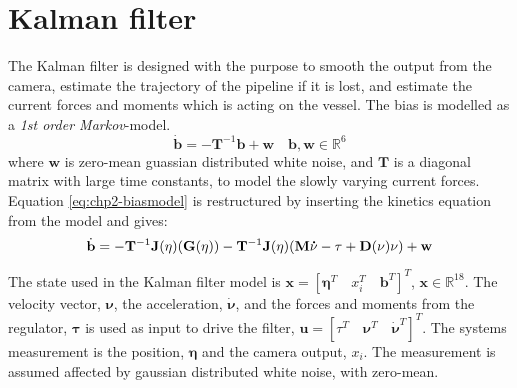 \section{Kalman filter}
	The Kalman filter is designed with the purpose to smooth the output from the camera, estimate the trajectory 
	of the pipeline if it is lost, and estimate the current forces and moments which is acting on the vessel. 
	The bias is modelled as a \textit{1st order Markov}-model.
	\begin{equation}
		\label{eq:chp2-biasmodel}
		\dot{\mathbf{b}} = -\mathbf{T}^{-1} \mathbf{b} + \mathbf{w} \quad \mathbf{b}, \mathbf{w} \in \mathbb{R}^6
	\end{equation}
	where $\mathbf{w}$ is zero-mean guassian distributed white noise, and $\mathbf{T}$ is a diagonal matrix with 
	large time constants, to model the slowly varying current forces. 
	Equation \eqref{eq:chp2-biasmodel} is restructured by inserting the kinetics equation from the model and gives:
	\begin{equation}
		\dot{\mathbf{b}} = -\mathbf{T}^{-1} \mathbf{J}(\mathbf{\eta}) (\mathbf{G}(\mathbf{\eta})) - \mathbf{T}^{-1} 
		\mathbf{J}(\mathbf{\eta}) (\mathbf{M}\mathbf{\dot{\nu}} - \tau + \mathbf{D}(\mathbf{\nu})\mathbf{\nu}) + \mathbf{w}
	\end{equation}

	
	The state used in the Kalman filter model is $\mathbf{x} = [\mathbf{\eta}^T \quad x_i^T 
	\quad \mathbf{b}^T]^T$, $\mathbf{x} \in \mathbb{R}^{18}$. The velocity vector, $\mathbf{\nu}$, 
	the acceleration, $\dot{\mathbf{\nu}}$, and the forces and moments from the regulator, $\mathbf{\tau}$ is 
	used as input to drive the filter, $\mathbf{u} = [\tau^T \quad \mathbf{\nu}^T \quad \mathbf{\dot{\nu}}^T]^T$. 
	The systems measurement is the position, $\mathbf{\eta}$ and the camera output, $x_i$. The measurement is 
	assumed affected by gaussian distributed white noise, with zero-mean.
	
